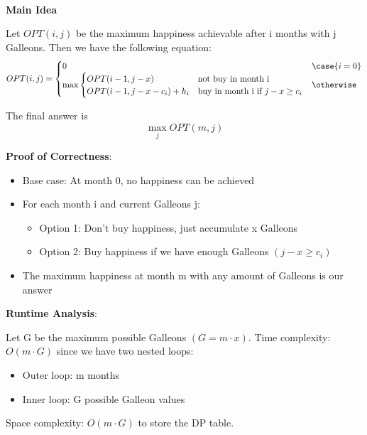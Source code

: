 \begin{solution}
    \\
    \textbf{Main Idea}
    
    Let $OPT(i,j)$ be the maximum happiness achievable after i months with j Galleons.
    Then we have the following equation:
    \[
    OPT(i,j)=
    \begin{cases}
        0 & \case{i=0} \\
        \max\begin{cases}
            OPT(i-1,j-x) & \text{not buy in month i}\\
            OPT(i-1,j-x-c_i)+h_i & \text{buy in month i if } j-x \geq c_i
        \end{cases} & \otherwise
    \end{cases}
    \]

    The final answer is 
    \[ \max_{j} OPT(m,j) \]

    \textbf{Proof of Correctness}: 

    \begin{itemize}
        \item Base case: At month 0, no happiness can be achieved
        \item For each month i and current Galleons j:
            \begin{itemize}
                \item Option 1: Don't buy happiness, just accumulate x Galleons
                \item Option 2: Buy happiness if we have enough Galleons $(j-x \geq c_i)$
            \end{itemize}
        \item The maximum happiness at month m with any amount of Galleons is our answer
    \end{itemize}

    \textbf{Runtime Analysis}: 

    Let G be the maximum possible Galleons $(G = m·x)$.
    Time complexity: $O(m·G)$ since we have two nested loops:
    \begin{itemize}
        \item Outer loop: m months
        \item Inner loop: G possible Galleon values
    \end{itemize}
    Space complexity: $O(m·G)$ to store the DP table.
\end{solution}